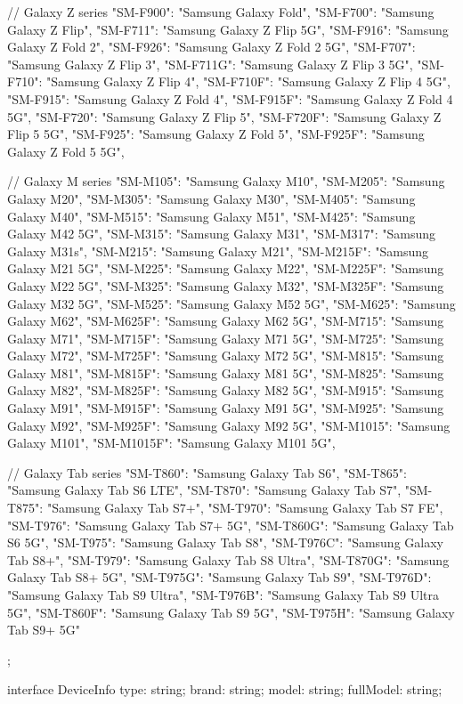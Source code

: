 {  // Galaxy Z series
"SM-F900": "Samsung Galaxy Fold",
  "SM-F700": "Samsung Galaxy Z Flip",
  "SM-F711": "Samsung Galaxy Z Flip 5G",
  "SM-F916": "Samsung Galaxy Z Fold 2",
  "SM-F926": "Samsung Galaxy Z Fold 2 5G",
  "SM-F707": "Samsung Galaxy Z Flip 3",
  "SM-F711G": "Samsung Galaxy Z Flip 3 5G",
  "SM-F710": "Samsung Galaxy Z Flip 4",
  "SM-F710F": "Samsung Galaxy Z Flip 4 5G",
  "SM-F915": "Samsung Galaxy Z Fold 4",
  "SM-F915F": "Samsung Galaxy Z Fold 4 5G",
  "SM-F720": "Samsung Galaxy Z Flip 5",
  "SM-F720F": "Samsung Galaxy Z Flip 5 5G",
  "SM-F925": "Samsung Galaxy Z Fold 5",
  "SM-F925F": "Samsung Galaxy Z Fold 5 5G",

  // Galaxy M series
  "SM-M105": "Samsung Galaxy M10",
  "SM-M205": "Samsung Galaxy M20",
  "SM-M305": "Samsung Galaxy M30",
  "SM-M405": "Samsung Galaxy M40",
  "SM-M515": "Samsung Galaxy M51",
  "SM-M425": "Samsung Galaxy M42 5G",
  "SM-M315": "Samsung Galaxy M31",
  "SM-M317": "Samsung Galaxy M31s",
  "SM-M215": "Samsung Galaxy M21",
  "SM-M215F": "Samsung Galaxy M21 5G",
  "SM-M225": "Samsung Galaxy M22",
  "SM-M225F": "Samsung Galaxy M22 5G",
  "SM-M325": "Samsung Galaxy M32",
  "SM-M325F": "Samsung Galaxy M32 5G",
  "SM-M525": "Samsung Galaxy M52 5G",
  "SM-M625": "Samsung Galaxy M62",
  "SM-M625F": "Samsung Galaxy M62 5G",
  "SM-M715": "Samsung Galaxy M71",
  "SM-M715F": "Samsung Galaxy M71 5G",
  "SM-M725": "Samsung Galaxy M72",
  "SM-M725F": "Samsung Galaxy M72 5G",
  "SM-M815": "Samsung Galaxy M81",
  "SM-M815F": "Samsung Galaxy M81 5G",
  "SM-M825": "Samsung Galaxy M82",
  "SM-M825F": "Samsung Galaxy M82 5G",
  "SM-M915": "Samsung Galaxy M91",
  "SM-M915F": "Samsung Galaxy M91 5G",
  "SM-M925": "Samsung Galaxy M92",
  "SM-M925F": "Samsung Galaxy M92 5G",
  "SM-M1015": "Samsung Galaxy M101",
  "SM-M1015F": "Samsung Galaxy M101 5G",

  // Galaxy Tab series
"SM-T860": "Samsung Galaxy Tab S6",
"SM-T865": "Samsung Galaxy Tab S6 LTE",
"SM-T870": "Samsung Galaxy Tab S7",
"SM-T875": "Samsung Galaxy Tab S7+",
"SM-T970": "Samsung Galaxy Tab S7 FE",
"SM-T976": "Samsung Galaxy Tab S7+ 5G",
"SM-T860G": "Samsung Galaxy Tab S6 5G",
"SM-T975": "Samsung Galaxy Tab S8",
"SM-T976C": "Samsung Galaxy Tab S8+",
"SM-T979": "Samsung Galaxy Tab S8 Ultra",
"SM-T870G": "Samsung Galaxy Tab S8+ 5G",
"SM-T975G": "Samsung Galaxy Tab S9",
"SM-T976D": "Samsung Galaxy Tab S9 Ultra",
"SM-T976B": "Samsung Galaxy Tab S9 Ultra 5G",
"SM-T860F": "Samsung Galaxy Tab S9 5G",
"SM-T975H": "Samsung Galaxy Tab S9+ 5G"
};


interface DeviceInfo {
  type: string;
  brand: string;
  model: string;
  fullModel: string;
}

